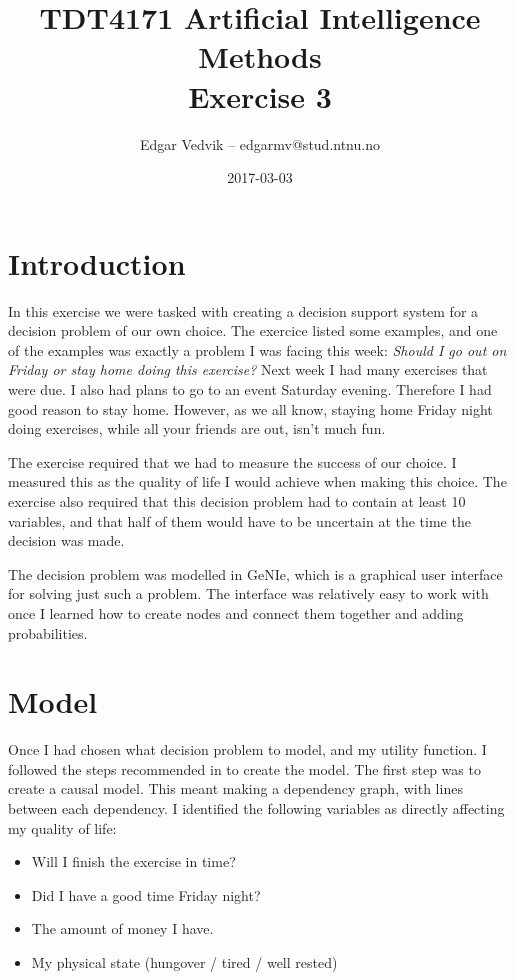 \documentclass{article}
\title{TDT4171 Artificial Intelligence Methods\\ Exercise 3}
\author{Edgar Vedvik -- edgarmv@stud.ntnu.no}
\date{2017-03-03}
\begin{document}
\maketitle

\begin{abstract}
    \blindtext
    
\end{abstract}

\section*{Introduction}
    In this exercise we were tasked with creating a decision support system for
    a decision problem of our own choice. The exercice listed some examples,
    and one of the examples was exactly a problem I was facing this week:
    \emph{Should I go out on Friday or stay home doing this exercise?} Next week
    I had many exercises that were due. I also had plans to go to an event
    Saturday evening. Therefore I had good reason to stay home. However, as
    we all know, staying home Friday night doing exercises, while all your
    friends are out, isn't much fun.
    
    The exercise required that we had to measure the success of our choice. I
    measured this as the quality of life I would achieve when making this
    choice. The exercise also required that this decision problem had to
    contain at least 10 variables, and that half of them would have to be
    uncertain at the time the decision was made.

    The decision problem was modelled in GeNIe, which is a graphical user
    interface for solving just such a problem. The interface was relatively
    easy to work with once I learned how to create nodes and connect them
    together and adding probabilities.

\section*{Model}

    Once I had chosen what decision problem to model, and my utility function.
    I followed the steps recommended in  to create
    the model. The first step was to create a causal model. This meant making a
    dependency graph, with lines between each dependency. I identified the
    following variables as directly affecting my quality of life:
    \begin{itemize}
        \item Will I finish the exercise in time?
        \item Did I have a good time Friday night?
        \item The amount of money I have.
        \item My physical state (hungover / tired / well rested)
    \end{itemize}
\end{document}
